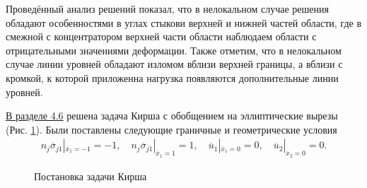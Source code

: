
Проведённый анализ решений показал, что в нелокальном случае решения обладают особенностями в углах стыкови верхней и нижней частей области, где в смежной с концентратором верхней части области наблюдаем области с отрицательными значениями деформации. Также отметим, что в нелокальном случае линии уровней обладают изломом вблизи верхней границы, а вблизи с кромкой, к которой приложенна нагрузка появляются дополнительные линии уровней.

\underline{В разделе 4.6} решена задача Кирша с обобщением на эллиптические вырезы (Рис. \ref{fig:KirshProblem}). Были поставлены следующие граничные и геометрические условия
\begin{gather*}
	n_j \overline{\sigma}_{j1} |_{\overline{x}_1 = -1} = -1,
	\quad
	n_j \overline{\sigma}_{j1} |_{\overline{x}_1 = 1} = 1,
	\quad
	\overline{u}_1 |_{\overline{x}_1 = 0} = 0,
	\quad
	\overline{u}_2 |_{\overline{x}_2 = 0} = 0.
\end{gather*}

\begin{figure}[ht]
    \caption{Постановка задачи Кирша}
    \label{fig:KirshProblem}
\end{figure}

